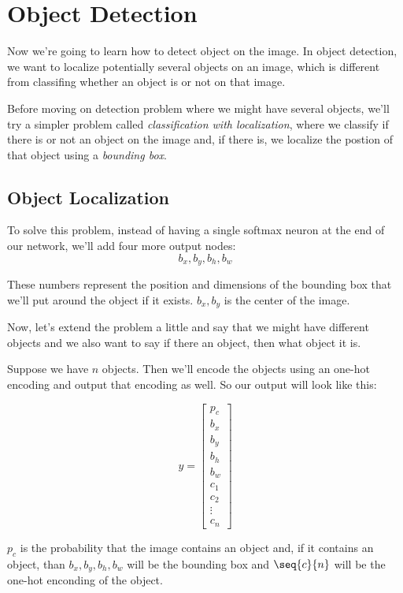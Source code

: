 \documentclass[12pt, a4paper, oneside]{book}
\begin{document}
\section{Object Detection}%
\label{sec:object_detection}

Now we're going to learn how to detect object on the image. In object detection,
we want to localize potentially several objects on an image, which is different
from classifing whether an object is or not on that image.

Before moving on detection problem where we might have several objects, we'll
try a simpler problem called \textit{classification with localization}, where we
classify if there is or not an object on the image and, if there is, we localize
the postion of that object using a \textit{bounding box}.

\subsection{Object Localization}%
\label{sub:object_localization}

To solve this problem, instead of having a single softmax neuron at the end of
our network, we'll add four more output nodes:
\[
b_x, b_y, b_h, b_w
\]

These numbers represent the position and dimensions of the bounding box that
we'll put around the object if it exists. $b_x, b_y$ is the center of the image.

Now, let's extend the problem a little and say that we might have different
objects and we also want to say if there an object, then what object it is.

Suppose we have $n$ objects. Then we'll encode the objects using an one-hot
encoding and output that encoding as well. So our output will look like this:

\[
    y = \begin{bmatrix}
        p_c \\ b_x \\ b_y \\ b_h \\ b_w \\
        c_1 \\ c_2 \\ \vdots \\ c_n
    \end{bmatrix}
\]

$p_c$ is the probability that the image contains an object and, if it contains
an object, than $b_x,b_y,b_h,b_w$ will be the bounding box and $\seq{c}{n}$
will be the one-hot enconding of the object.
\end{document}
